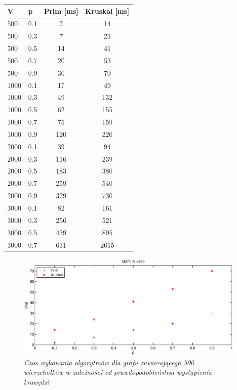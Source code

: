 \documentclass[a4paper, 10pt]{article}
\begin{document}
\begin{center}
    \begin{tabular}{| l | l | c | c |}
    \hline
    V & p & Prim [ms] & Kruskal [ms] \\ \hline
	500 & 0.1 & 2 & 14  \\ 
	500 & 0.3 & 7& 23  \\ 
	500 & 0.5 & 14& 41  \\ 
	500 & 0.7 & 20& 53  \\ 
	500 & 0.9 & 30& 70  \\ \hline
	1000 & 0.1 & 17& 49  \\ 
	1000 & 0.3 & 49& 132  \\ 
	1000 & 0.5 & 62& 155 \\ 
	1000 & 0.7 & 75& 159 \\ 
	1000 & 0.9 & 120& 220  \\ \hline
	2000 & 0.1 & 39& 94  \\ 
	2000 & 0.3 & 116& 239  \\ 
	2000 & 0.5 & 183& 380  \\ 
	2000 & 0.7 & 259& 540  \\ 
	2000 & 0.9 & 329& 730  \\ \hline
	3000 & 0.1 & 82& 161\\ 
	3000 & 0.3 & 256& 521  \\ 
	3000 & 0.5 & 439& 895  \\ 
	3000 & 0.7 & 611& 2615  \\ \hline
    \end{tabular}
\end{center}



\begin{figure}[ht!]
\centering
\includegraphics[width=165mm]{wykresy/v500.eps}
\caption{\it{Czas wykonania algorytmów dla grafu zawierającego 500 wierzchołków w zależności od prawdopodobieństwa wystąpienia krawędzi}}
\label{overflow}
\end{figure}
\end{document}

